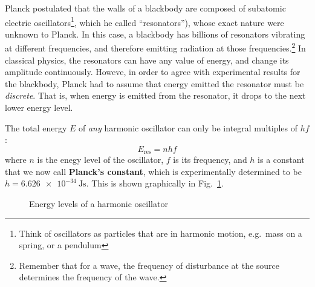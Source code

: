 \documentclass[11pt]{article}
\begin{document}
Planck postulated that the walls of a blackbody are composed of subatomic
electric oscillators\footnote{Think of oscillators as particles that are in
  harmonic motion, e.g.\ mass on a spring, or a pendulum}, which he called
``resonators''), whose exact nature were unknown to Planck. In this case, a
blackbody has billions of resonators vibrating at different frequencies, and
therefore emitting radiation at those frequencies.\footnote{Remember that for a
  wave, the frequency of disturbance at the source determines the frequency of
  the wave.} In classical physics, the resonators can have any value of energy,
and change its amplitude continuously. Howeve, in order to agree with
experimental results for the blackbody, Planck had to assume that energy
emitted the resonator must be \emph{discrete}. That is, when energy is emitted
from the resonator, it drops to the next lower energy level.

The total energy $E$ of \emph{any} harmonic oscillator can only be integral
multiples of $hf$:
\begin{equation}
  \boxed{E_{\textrm{res}}=nhf}
  \label{eq:nhf}
\end{equation}
where $n$ is the enegy level of the oscillator, $f$ is its frequency, and $h$
is a constant that we now call \textbf{Planck's constant}, which is
experimentally determined to be $h=\SI{6.626e-34}{\joule\second}$. This is
shown graphically in Fig.~\ref{fig:quantization}.
\begin{figure}[ht]
  \centering
  \caption{Energy levels of a harmonic oscillator}
  \label{fig:quantization}
\end{figure}
\end{document}

